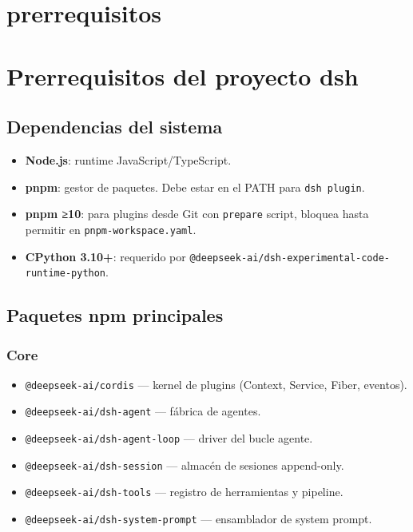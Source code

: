 \documentclass[11pt,a4paper]{article}
\begin{document}
\section*{prerrequisitos}

\section*{Prerrequisitos del proyecto dsh}


\subsection*{Dependencias del sistema}


\begin{itemize}[leftmargin=*,topsep=2pt,itemsep=1pt]
  \item \textbf{Node.js}: runtime JavaScript/TypeScript.
  \item \textbf{pnpm}: gestor de paquetes. Debe estar en el PATH para \texttt{dsh plugin}.
  \item \textbf{pnpm ≥10}: para plugins desde Git con \texttt{prepare} script, bloquea hasta permitir en \texttt{pnpm-workspace.yaml}.
  \item \textbf{CPython 3.10+}: requerido por \texttt{@deepseek-ai/dsh-experimental-code-runtime-python}.
\end{itemize}


\subsection*{Paquetes npm principales}


\subsubsection*{Core}


\begin{itemize}[leftmargin=*,topsep=2pt,itemsep=1pt]
  \item \texttt{@deepseek-ai/cordis} — kernel de plugins (Context, Service, Fiber, eventos).
  \item \texttt{@deepseek-ai/dsh-agent} — fábrica de agentes.
  \item \texttt{@deepseek-ai/dsh-agent-loop} — driver del bucle agente.
  \item \texttt{@deepseek-ai/dsh-session} — almacén de sesiones append-only.
  \item \texttt{@deepseek-ai/dsh-tools} — registro de herramientas y pipeline.
  \item \texttt{@deepseek-ai/dsh-system-prompt} — ensamblador de system prompt.
\end{itemize}
\end{document}
